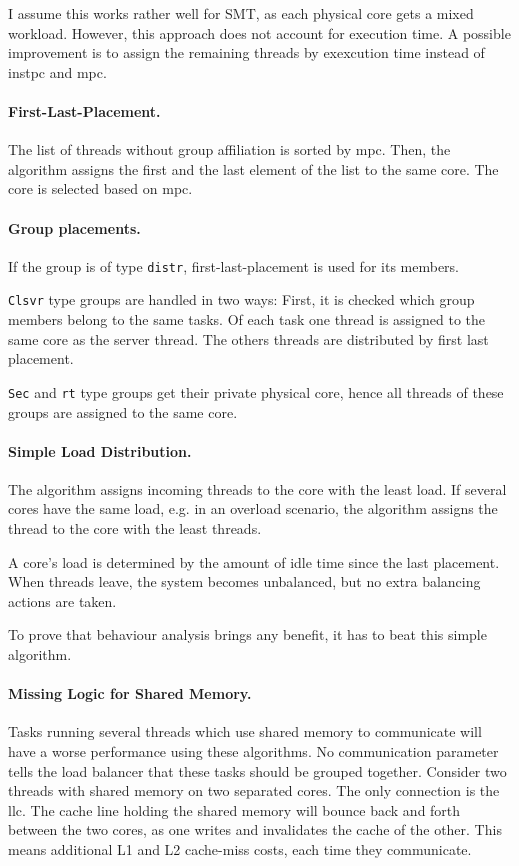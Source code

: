 I assume this works rather well for SMT, as each physical core gets a mixed
workload.
However, this approach does not account for execution time.
A possible improvement is to assign the remaining threads by
exexcution time instead of \gls{instpc} and \gls{mpc}.


\paragraph{First-Last-Placement.}
The list of threads without group affiliation is sorted by \gls{mpc}.
Then, the algorithm assigns the first and the last element of the list to the
same core.
The core is selected based on \gls{mpc}.


\paragraph{Group placements.}
If the group is of type \texttt{distr}, first-last-placement is used for its
members.

\texttt{Clsvr} type groups are handled in two ways: First, it is checked which
group members belong to the same tasks.
Of each task one thread is assigned to the same core as the server thread.
The others threads are distributed by first last placement.

\texttt{Sec} and \texttt{rt} type groups get their private physical core, hence
all threads of these groups are assigned to the same core.


\paragraph{Simple Load Distribution.}
The algorithm assigns incoming threads to the core with the least load.
If several cores have the same load, e.g. in an overload scenario, the
algorithm assigns the thread to the core with the least threads.

A core's load is determined by the amount of idle time since the last
placement.
When threads leave, the system becomes unbalanced, but no extra balancing
actions are taken.

To prove that behaviour analysis brings any benefit, it has to beat
this simple algorithm.


\paragraph{Missing Logic for Shared Memory.}
Tasks running several threads which use shared memory to communicate will have
a worse performance using these algorithms.
No communication parameter tells the load balancer that these tasks should be
grouped together.
Consider two threads with shared memory on two separated cores.
The only connection is the \gls{llc}.
The cache line holding the shared memory will bounce back and forth between
the two cores, as one writes and invalidates the cache of the other.
This means additional L1 and L2 cache-miss costs, each time they communicate.

